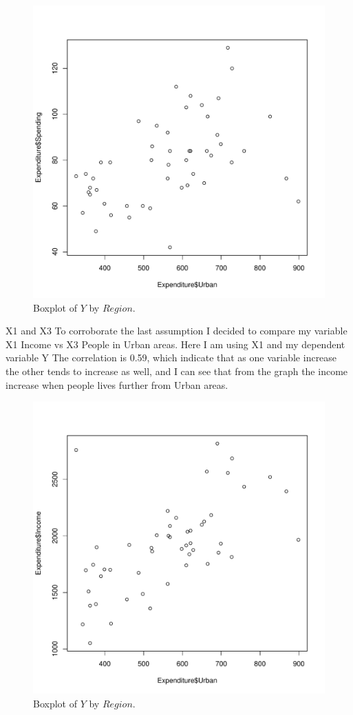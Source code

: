 \documentclass[12pt,letterpaper]{article}
\begin{document}
\begin{itemize}
	\begin{figure}[h!]\centering
		\caption{\footnotesize Boxplot of $Y$ by $Region$.}\vspace{-1cm}
		\label{fig:plot_3c}
		\includegraphics[width=.75\textwidth]{IMAGEP2_A1.pdf}
	\end{figure}
	
	X1 and X3
	To corroborate the last assumption I decided to compare my variable X1 Income vs X3 People in Urban areas.
	Here I am using X1 and my dependent variable Y
	The correlation is 0.59, which indicate that as one variable increase the other tends to increase as well, and I can see that from the graph the income increase when people lives further from Urban areas. 
	
	
	\begin{figure}[h!]\centering
		\caption{\footnotesize Boxplot of $Y$ by $Region$.}\vspace{-1cm}
		\label{fig:plot_3c}
		\includegraphics[width=.75\textwidth]{IMAGEP2_A2.pdf}
	\end{figure}
	

\end{itemize}
\end{document}
